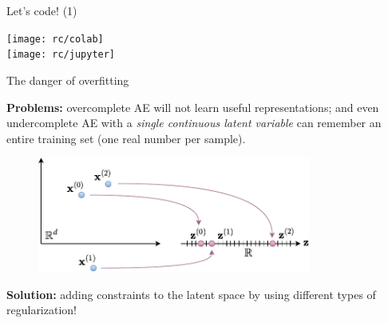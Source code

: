 \documentclass[handout]{beamer}
\begin{document}
  \begin{frame}{Let's code! (1)}

    \centering
    \texttt{[image: rc/colab]}\\
    \vspace{1cm}
    \texttt{[image: rc/jupyter]}


    
  \end{frame}

  \begin{frame}{The danger of overfitting}
    
    \textbf{Problems:} overcomplete AE will not learn useful representations; and even undercomplete AE with a \emph{single continuous latent variable} can remember an entire training set (one real number per sample).

    \begin{figure}
      \includegraphics[width=0.8\textwidth]{rc/ae-real-numbers}
    \end{figure}
    \pause
    \textbf{Solution:} adding \alert{constraints} to the latent space by using different types of \alert{regularization}! 

  \end{frame}
\end{document}
